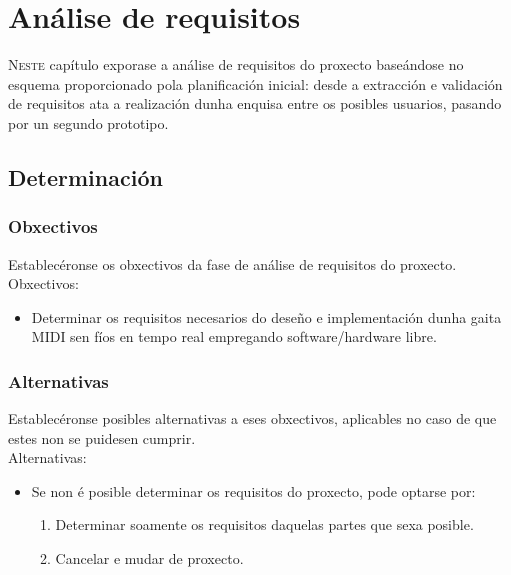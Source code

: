 \chapter{Análise de requisitos}
\minitoc
\label{chap:requisitos}
\vspace{0.5cm}


\lettrine{N}{este} capítulo exporase a análise de requisitos do proxecto
baseándose no esquema proporcionado pola planificación inicial: desde a
extracción e validación de requisitos ata a realización dunha enquisa entre os
posibles usuarios, pasando por un segundo prototipo.

\section{Determinación}

 \subsection{Obxectivos}

 Establecéronse os obxectivos da fase de análise de requisitos do proxecto. \\

 Obxectivos:

 \begin{itemize}
  \item Determinar os requisitos necesarios do deseño e implementación dunha
        gaita MIDI sen fíos en tempo real empregando software/hardware libre.
 \end{itemize}

 \subsection{Alternativas}

 Establecéronse posibles alternativas a eses obxectivos, aplicables no caso de
 que estes non se puidesen cumprir. \\

 Alternativas:

 \begin{itemize}
  \item Se non é posible determinar os requisitos do proxecto, pode optarse
        por:
        \begin{enumerate}
         \item Determinar soamente os requisitos daquelas partes que sexa
               posible.
         \item Cancelar e mudar de proxecto.
        \end{enumerate}
 \end{itemize}

